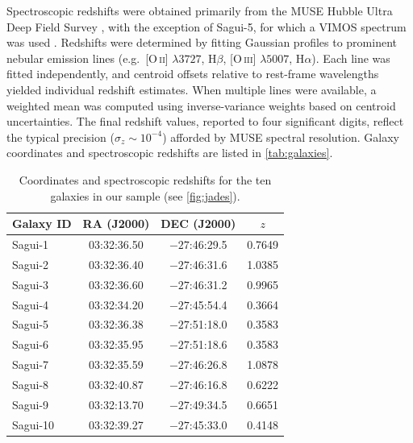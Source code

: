 \documentclass[fleqn,usenatbib]{mnras}
\begin{document}
Spectroscopic redshifts were obtained primarily from the MUSE Hubble Ultra Deep Field Survey \citep{2017A&A...608A...1B, 2023A&A...670A...4B}, with the exception of Sagui-5, for which a VIMOS spectrum was used \citep{2009A&A...494..443P}. Redshifts were determined by fitting Gaussian profiles to prominent nebular emission lines (e.g.\ [O\,\textsc{ii}] $\lambda3727$, H$\beta$, [O\,\textsc{iii}] $\lambda5007$, H$\alpha$). Each line was fitted independently, and centroid offsets relative to rest-frame wavelengths yielded individual redshift estimates. When multiple lines were available, a weighted mean was computed using inverse-variance weights based on centroid uncertainties. The final redshift values, reported to four significant digits, reflect the typical precision ($\sigma_z \sim 10^{-4}$) afforded by MUSE spectral resolution. Galaxy coordinates and spectroscopic redshifts are listed in \autoref{tab:galaxies}.

\begin{table}
\centering
\caption{Coordinates and spectroscopic redshifts for the ten galaxies in our sample (see \autoref{fig:jades}).}
\begin{tabular}{lccc}
\hline
Galaxy ID & RA (J2000) & DEC (J2000) & $z$ \\
\hline
Sagui-1 & 03:32:36.50 & $-27$:46:29.5 & 0.7649 \\
Sagui-2 & 03:32:36.40 & $-27$:46:31.6 & 1.0385 \\
Sagui-3 & 03:32:36.60 & $-27$:46:31.2 & 0.9965 \\
Sagui-4 & 03:32:34.20 & $-27$:45:54.4 & 0.3664 \\
Sagui-5 & 03:32:36.38 & $-27$:51:18.0 & 0.3583 \\
Sagui-6 & 03:32:35.95 & $-27$:51:18.6 & 0.3583 \\
Sagui-7 & 03:32:35.59 & $-27$:46:26.8 & 1.0878 \\
Sagui-8 & 03:32:40.87 & $-27$:46:16.8 & 0.6222 \\
Sagui-9 & 03:32:13.70 & $-27$:49:34.5 & 0.6651 \\
Sagui-10 & 03:32:39.27 & $-27$:45:33.0 & 0.4148 \\   
\hline
\end{tabular}
\label{tab:galaxies}
\end{table}
\end{document}
